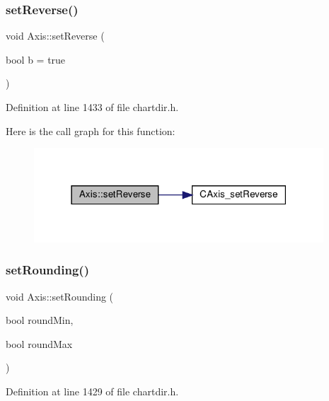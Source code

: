 \subsubsection{\texorpdfstring{set\+Reverse()}{setReverse()}}
{\footnotesize\ttfamily void Axis\+::set\+Reverse (\begin{DoxyParamCaption}\item[{bool}]{b = {\ttfamily true} }\end{DoxyParamCaption})\hspace{0.3cm}{\ttfamily [inline]}}



Definition at line 1433 of file chartdir.\+h.

Here is the call graph for this function\+:
\nopagebreak
\begin{figure}[H]
\begin{center}
\leavevmode
\includegraphics[width=307pt]{class_axis_ab18969dbb7b9f59e170b7b5e72c4208e_cgraph}
\end{center}
\end{figure}
\mbox{\label{class_axis_a7e296867580eabe94b1b80abb5318762}} 
\subsubsection{\texorpdfstring{set\+Rounding()}{setRounding()}}
{\footnotesize\ttfamily void Axis\+::set\+Rounding (\begin{DoxyParamCaption}\item[{bool}]{round\+Min,  }\item[{bool}]{round\+Max }\end{DoxyParamCaption})\hspace{0.3cm}{\ttfamily [inline]}}



Definition at line 1429 of file chartdir.\+h.

